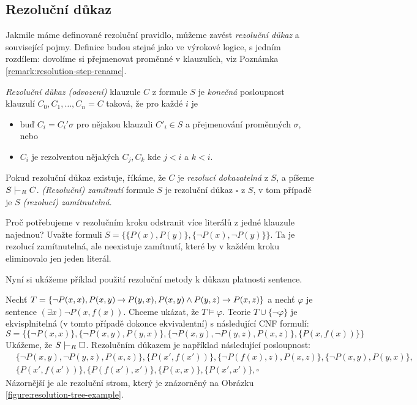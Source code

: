 \subsection{Rezoluční důkaz}

Jakmile máme definované rezoluční pravidlo, můžeme zavést \emph{rezoluční důkaz} a související pojmy. Definice budou stejné jako ve výrokové logice, s jedním rozdílem: dovolíme si přejmenovat proměnné v klauzulích, viz Poznámka \ref{remark:resolution-step-rename}.


\begin{definition}
    \emph{Rezoluční důkaz (odvození)} klauzule $C$ z formule $S$ je \emph{konečná} posloupnost klauzulí $C_0,C_1,\dots,C_n=C$
    taková, že pro každé $i$ je 
    \begin{itemize}
        \item buď $C_i=C_i'\sigma$ pro nějakou klauzuli $C'_i\in S$ a přejmenování proměnných $\sigma$, nebo
        \item $C_i$ je rezolventou nějakých $C_j,C_k$ kde $j<i$ a $k<i$.
    \end{itemize}
    Pokud rezoluční důkaz existuje, říkáme, že $C$ je \emph{rezolucí dokazatelná} z $S$, a píšeme $S\proves_R C$. \emph{(Rezoluční) zamítnutí} formule $S$ je rezoluční důkaz $\square$ z $S$, v tom případě je $S$ \emph{(rezolucí) zamítnutelná}.
\end{definition}

\begin{remark}
    Proč potřebujeme v rezolučním kroku odstranit více literálů z jedné klauzule najednou? Uvažte formuli $S=\{\{P(x),P(y)\},\{\neg P(x),\neg P(y)\}\}$. Ta je rezolucí zamítnutelná, ale neexistuje zamítnutí, které by v každém kroku eliminovalo jen jeden literál.
\end{remark}

Nyní si ukážeme příklad použití rezoluční metody k důkazu platnosti sentence.

\begin{example}\label{example:resolution-proof-predicate}
Nechť $T=\{\neg P(x,x),P(x,y) \mathbin{\rightarrow} P(y,x), P(x,y)\land P(y,z)\to P(x,z)\}$ a nechť $\varphi$ je sentence $(\exists x)\neg P(x,f(x))$. Chceme ukázat, že $T\models\varphi$. Teorie $T\cup\{\neg\varphi\}$ je ekvisplnitelná (v tomto případě dokonce ekvivalentní) s následující CNF formulí:
$$S=\{\{\neg P(x,x)\},\{\neg P(x,y),P(y,x)\},\{\neg P(x,y),\neg P(y,z), P(x,z)\},\{P(x,f(x))\}\}$$
Ukážeme, že $S\proves_R\square$. Rezolučním důkazem je například následující posloupnost:
\begin{align*}
    &\{\neg P(x,y),\neg P(y,z), P(x,z)\},
    \{P(x',f(x'))\},
    \{\neg P(f(x),z),P(x,z)\},
    \{\neg P(x,y),P(y,x)\},\\
    &\{P(x',f(x'))\},
    \{P(f(x'),x')\},
    \{P(x,x)\},
    \{P(x',x')\},
    \square   
\end{align*}
Názornější je ale rezoluční strom, který je znázorněný na Obrázku \ref{figure:resolution-tree-example}.
\end{example}

